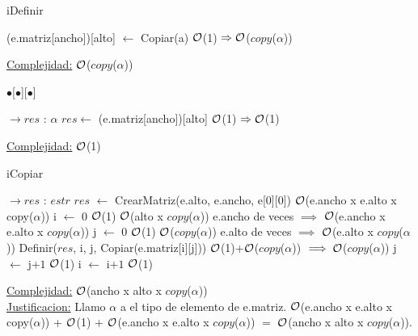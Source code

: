 \begin{Representacion}
\begin{Algoritmos}
\begin{algorithm}[H]
	\end{algorithm}
	
	\begin{algorithm}[H]
		\caption{iDefinir}
		
		\begin{algorithmic}[1]
			\State (e.matriz[ancho])[alto] $\leftarrow$ Copiar(a) \Comment $\mathcal{O}$(1) $\Rightarrow \mathcal{O}$($copy$($\alpha$))
			\EndProcedure
		\end{algorithmic}
		\underline{Complejidad:} $\mathcal{O}$($copy$($\alpha$))
		
	\end{algorithm}
	
	\begin{algorithm}[H]
		\caption{$\bullet$[$\bullet$][$\bullet$]}
		
		\begin{algorithmic}[1]
			 $\to res$ : $\alpha$
			\State $res \leftarrow$ (e.matriz[ancho])[alto] \Comment $\mathcal{O}$(1) $\Rightarrow \mathcal{O}$(1)
			\EndProcedure
		\end{algorithmic}
		\underline{Complejidad:} $\mathcal{O}$(1)
		
	\end{algorithm}
	
	\begin{algorithm}[H]
		\caption{iCopiar}
		
		\begin{algorithmic}[1]
			 $\to res$ : $estr$
			\State $res$ $\leftarrow$ CrearMatriz(e.alto, e.ancho, e[0][0]) \Comment $\mathcal{O}$(e.ancho x e.alto x copy($\alpha$))
			\State i $\leftarrow$ $0$ \Comment $\mathcal{O}$(1)
			 \Comment $\mathcal{O}$(alto x $copy$($\alpha$)) e.ancho de veces $\implies$ $\mathcal{O}$(e.ancho x e.alto x $copy$($\alpha$))
				\State j $\leftarrow$ $0$ \Comment $\mathcal{O}$(1)
				 \Comment $\mathcal{O}$($copy$($\alpha$)) e.alto de veces $\implies$  $\mathcal{O}$(e.alto x $copy$($\alpha$))
					\State Definir($res$, i, j, Copiar(e.matriz[i][j])) \Comment $\mathcal{O}$(1)+$\mathcal{O}$($copy$($\alpha$)) $\implies \mathcal{O}$($copy$($\alpha$))
					\State j $\leftarrow$ j$+1$ \Comment $\mathcal{O}$(1)
				\EndWhile
				\State i $\leftarrow$ i$+1$ \Comment $\mathcal{O}$(1)
			\EndWhile
			\EndProcedure
		\end{algorithmic}
		\underline{Complejidad:} $\mathcal{O}$(ancho x alto x $copy$($\alpha$))
		\\
		\underline{Justificacion:} Llamo $\alpha$ a el tipo de elemento de e.matriz. $\mathcal{O}$(e.ancho x e.alto x copy($\alpha$)) + $\mathcal{O}$(1) + $\mathcal{O}$(e.ancho x e.alto x $copy$($\alpha$)) $=$ $\mathcal{O}$(ancho x alto x $copy$($\alpha$)).
		

\end{algorithm}
\end{Algoritmos}
\end{Representacion}
